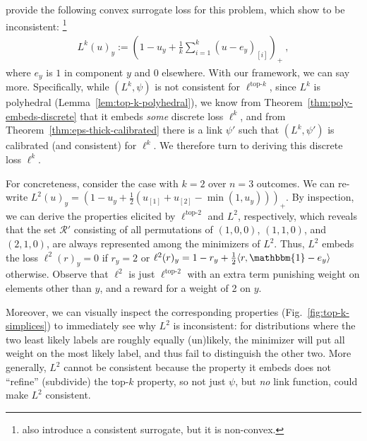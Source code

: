 \documentclass[11pt]{article}
\newcommand{\R}{\mathcal{R}}
\newcommand{\inprod}[2]{\langle #1, #2 \rangle}%
\newcommand{\ones}{\mathbbm{1}}
\newcommand{\elltopk}{\ell^{\text{top-$k$}}}
\newcommand{\elltop}[1]{\ell^{\text{top-$#1$}}}
\begin{document}
\citet{lapin2015top, lapin2016loss, lapin2018analysis} provide the following convex surrogate loss for this problem, which \citet{yang2018consistency} show to be inconsistent:%
\footnote{\citet{yang2018consistency} also introduce a consistent surrogate, but it is non-convex.}
\begin{align}\label{eq:L-2-surrogate}
L^k(u)_y := \left( 1-u_y + \tfrac{1}{k} \textstyle\sum_{i=1}^k (u - e_y)_{[i]} \right)_+~,
\end{align}
where $e_y$ is $1$ in component $y$ and 0 elsewhere.
With our framework, we can say more.
Specifically, while $(L^k,\psi)$ is not consistent for $\elltopk$, since $L^k$ is polyhedral (Lemma~\ref{lem:top-k-polyhedral}), we know from Theorem~\ref{thm:poly-embeds-discrete} that it embeds \emph{some} discrete loss $\ell^k$, and from Theorem~\ref{thm:eps-thick-calibrated} there is a link $\psi'$ such that $(L^k,\psi')$ is calibrated (and consistent) for $\ell^k$.
We therefore turn to deriving this discrete loss $\ell^k$.

For concreteness, consider the case with $k = 2$ over $n=3$ outcomes.
We can re-write $L^2(u)_y = \left(1 - u_y + \tfrac 1 2 (u_{[1]}+ u_{[2]} - \min(1,u_y))\right)_+$.
By inspection, we can derive the properties elicited by $\elltop{2}$ and $L^2$, respectively, which reveals that the set $\R'$ consisting of all permutations of $(1,0,0)$, $(1,1,0)$, and $(2,1,0)$, are always represented among the minimizers of $L^2$.
Thus, $L^2$ embeds the loss $\ell^2(r)_y = 0$ if $r_y = 2$ or $\ell^2(r)_y = 1 - r_y + \tfrac 1 2 \inprod{r}{\ones-e_y}$ otherwise.
Observe that $\ell^2$ is just $\elltop{2}$ with an extra term punishing weight on elements other than $y$, and a reward for a weight of 2 on $y$.

Moreover, we can visually inspect the corresponding properties (Fig.~\ref{fig:top-k-simplices}) to immediately see why $L^2$ is inconsistent: for distributions where the two least likely labels are roughly equally (un)likely, the minimizer will put all weight on the most likely label, and thus fail to distinguish the other two.
More generally, $L^2$ cannot be consistent because the property it embeds does not ``refine'' (subdivide) the top-$k$ property, so not just $\psi$, but \emph{no} link function, could make $L^2$ consistent.
\end{document}
